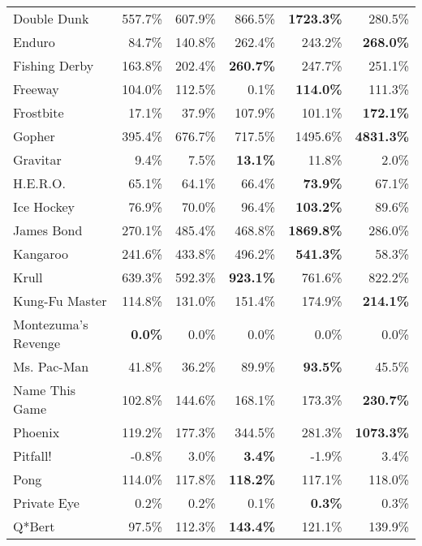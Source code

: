 \begin{table}[!htb]
\begin{center}
\begin{tabular}{l|rrr|rr}
         Double Dunk &   557.7\% &   607.9\% &   866.5\% &{\bf1723.3\%}&     280.5\% \\
              Enduro &    84.7\% &   140.8\% &   262.4\% &   243.2\% &{\bf268.0\%}\\
       Fishing Derby &   163.8\% &   202.4\% &{\bf260.7\%}&   247.7\% &     251.1\% \\
             Freeway &   104.0\% &   112.5\% &     0.1\% &{\bf114.0\%}&     111.3\% \\
           Frostbite &    17.1\% &    37.9\% &   107.9\% &   101.1\% &{\bf172.1\%}\\
              Gopher &   395.4\% &   676.7\% &   717.5\% &  1495.6\% &{\bf4831.3\%}\\
            Gravitar &     9.4\% &     7.5\% &{\bf13.1\%}&    11.8\% &       2.0\% \\
            H.E.R.O. &    65.1\% &    64.1\% &    66.4\% &{\bf73.9\%}&      67.1\% \\
          Ice Hockey &    76.9\% &    70.0\% &    96.4\% &{\bf103.2\%}&      89.6\% \\
          James Bond &   270.1\% &   485.4\% &   468.8\% &{\bf1869.8\%}&     286.0\% \\
            Kangaroo &   241.6\% &   433.8\% &   496.2\% &{\bf541.3\%}&      58.3\% \\
               Krull &   639.3\% &   592.3\% &{\bf923.1\%}&   761.6\% &     822.2\% \\
      Kung-Fu Master &   114.8\% &   131.0\% &   151.4\% &   174.9\% &{\bf214.1\%}\\
 Montezuma's Revenge &{\bf0.0\%}&     0.0\% &     0.0\% &     0.0\% &       0.0\% \\
         Ms. Pac-Man &    41.8\% &    36.2\% &    89.9\% &{\bf93.5\%}&      45.5\% \\
      Name This Game &   102.8\% &   144.6\% &   168.1\% &   173.3\% &{\bf230.7\%}\\
             Phoenix &   119.2\% &   177.3\% &   344.5\% &   281.3\% &{\bf1073.3\%}\\
            Pitfall! &    -0.8\% &     3.0\% &{\bf3.4\%}&    -1.9\% &       3.4\% \\
                Pong &   114.0\% &   117.8\% &{\bf118.2\%}&   117.1\% &     118.0\% \\
         Private Eye &     0.2\% &     0.2\% &     0.1\% &{\bf0.3\%}&       0.3\% \\
              Q*Bert &    97.5\% &   112.3\% &{\bf143.4\%}&   121.1\% &     139.9\% \\

\end{tabular}
\end{center}
\end{table}
